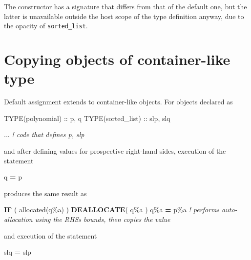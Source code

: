 \documentclass[
]{article}
\newenvironment{Shaded}{}{}
\newcommand{\CommentTok}[1]{\textcolor[rgb]{0.38,0.63,0.69}{\textit{#1}}}
\newcommand{\DataTypeTok}[1]{\textcolor[rgb]{0.56,0.13,0.00}{#1}}
\newcommand{\FunctionTok}[1]{\textcolor[rgb]{0.02,0.16,0.49}{#1}}
\newcommand{\KeywordTok}[1]{\textcolor[rgb]{0.00,0.44,0.13}{\textbf{#1}}}
\newcommand{\NormalTok}[1]{#1}
\newcommand{\OperatorTok}[1]{\textcolor[rgb]{0.40,0.40,0.40}{#1}}
\begin{document}
The constructor has a signature that differs from that of the default
one, but the latter is unavailable outside the host scope of the type
definition anyway, due to the opacity of \texttt{sorted\_list}.

\section{Copying objects of container-like
type}\label{copying-objects-of-container-like-type}

Default assignment extends to container-like objects. For objects
declared as

\begin{Shaded}
\begin{Highlighting}[]
\DataTypeTok{TYPE(polynomial)} \DataTypeTok{::}\NormalTok{ p, q}
\DataTypeTok{TYPE(sorted\_list)} \DataTypeTok{::}\NormalTok{ slp, slq}

\NormalTok{... }\CommentTok{! code that defines p, slp}
\end{Highlighting}
\end{Shaded}

and after defining values for prospective right-hand sides, execution of
the statement

\begin{Shaded}
\begin{Highlighting}[]
\NormalTok{q }\KeywordTok{=}\NormalTok{ p}
\end{Highlighting}
\end{Shaded}

produces the same result as

\begin{Shaded}
\begin{Highlighting}[]
\KeywordTok{IF}\NormalTok{ ( }\FunctionTok{allocated}\NormalTok{(q}\OperatorTok{\%}\NormalTok{a) ) }\KeywordTok{DEALLOCATE}\NormalTok{( q}\OperatorTok{\%}\NormalTok{a )}
\NormalTok{q}\OperatorTok{\%}\NormalTok{a }\KeywordTok{=}\NormalTok{ p}\OperatorTok{\%}\NormalTok{a  }\CommentTok{! performs auto{-}allocation using the RHS\textquotesingle{}s bounds, then copies the value}
\end{Highlighting}
\end{Shaded}

and execution of the statement

\begin{Shaded}
\begin{Highlighting}[]
\NormalTok{slq }\KeywordTok{=}\NormalTok{ slp}
\end{Highlighting}
\end{Shaded}
\end{document}
